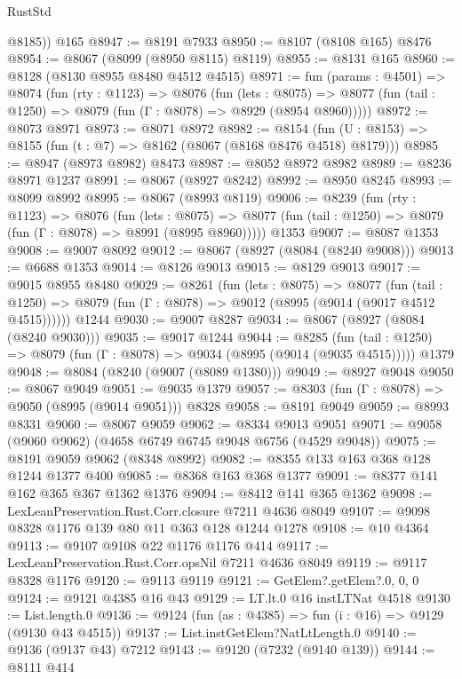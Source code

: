 \begin{lexlean}{RustStd}
\begin{coremodule}
        @8185))
    @165
@8947 := @8191 @7933
@8950 := @8107 (@8108 @165) @8476
@8954 := @8067 (@8099 (@8950 @8115) @8119)
@8955 := @8131 @165
@8960 := @8128 (@8130 @8955 @8480 @4512 @4515)
@8971 := fun (params : @4501) =>
  @8074
    (fun (rty : @1123) =>
    @8076
      (fun (lets : @8075) =>
      @8077 (fun (tail : @1250) => @8079 (fun (Γ : @8078) => @8929 (@8954 @8960)))))
@8972 := @8073 @8971
@8973 := @8071 @8972
@8982 := @8154 (fun (U : @8153) => @8155 (fun (t : @7) => @8162 (@8067 (@8168 @8476 @4518) @8179)))
@8985 := @8947 (@8973 @8982) @8473
@8987 := @8052 @8972 @8982
@8989 := @8236 @8971 @1237
@8991 := @8067 (@8927 @8242)
@8992 := @8950 @8245
@8993 := @8099 @8992
@8995 := @8067 (@8993 @8119)
@9006 := @8239
    (fun (rty : @1123) =>
    @8076
      (fun (lets : @8075) =>
      @8077 (fun (tail : @1250) => @8079 (fun (Γ : @8078) => @8991 (@8995 @8960)))))
    @1353
@9007 := @8087 @1353
@9008 := @9007 @8092
@9012 := @8067 (@8927 (@8084 (@8240 @9008)))
@9013 := @6688 @1353
@9014 := @8126 @9013
@9015 := @8129 @9013
@9017 := @9015 @8955 @8480
@9029 := @8261
    (fun (lets : @8075) =>
    @8077
      (fun (tail : @1250) => @8079 (fun (Γ : @8078) => @9012 (@8995 (@9014 (@9017 @4512 @4515))))))
    @1244
@9030 := @9007 @8287
@9034 := @8067 (@8927 (@8084 (@8240 @9030)))
@9035 := @9017 @1244
@9044 := @8285
    (fun (tail : @1250) => @8079 (fun (Γ : @8078) => @9034 (@8995 (@9014 (@9035 @4515)))))
    @1379
@9048 := @8084 (@8240 (@9007 (@8089 @1380)))
@9049 := @8927 @9048
@9050 := @8067 @9049
@9051 := @9035 @1379
@9057 := @8303 (fun (Γ : @8078) => @9050 (@8995 (@9014 @9051))) @8328
@9058 := @8191 @9049
@9059 := @8993 @8331
@9060 := @8067 @9059
@9062 := @8334 @9013 @9051
@9071 := @9058 (@9060 @9062) (@4658 @6749 @6745 @9048 @6756 (@4529 @9048))
@9075 := @8191 @9059 @9062 (@8348 @8992)
@9082 := @8355 @133 @163 @368 @128 @1244 @1377 @400
@9085 := @8368 @163 @368 @1377
@9091 := @8377 @141 @162 @365 @367 @1362 @1376
@9094 := @8412 @141 @365 @1362
@9098 := LexLeanPreservation.Rust.Corr.closure @7211 @4636 @8049
@9107 := @9098 @8328 @1176 @139 @80 @11 @363 @128 @1244 @1278
@9108 := @10 @4364
@9113 := @9107 @9108 @22 @1176 @1176 @414
@9117 := LexLeanPreservation.Rust.Corr.opsNil @7211 @4636 @8049
@9119 := @9117 @8328 @1176
@9120 := @9113 @9119
@9121 := GetElem?.getElem?.{0, 0, 0}
@9124 := @9121 @4385 @16 @43
@9129 := LT.lt.{0} @16 instLTNat @4518
@9130 := List.length.{0}
@9136 := @9124 (fun (as : @4385) => fun (i : @16) => @9129 (@9130 @43 @4515))
@9137 := List.instGetElem?NatLtLength.{0}
@9140 := @9136 (@9137 @43) @7212
@9143 := @9120 (@7232 (@9140 @139))
@9144 := @8111 @414

\end{coremodule}
\end{lexlean}
